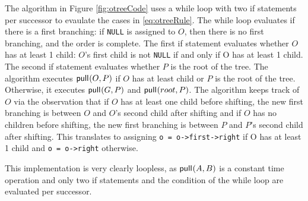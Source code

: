     The algorithm in Figure \ref{fig:otreeCode} uses a while loop with two if statements per successor to evaulate the cases in \eqref{eq:otreeRule}.  The while loop evaluates if there is a first branching: if \verb+NULL+ is assigned to $O$, then there is no first branching, and the order is complete.  The first if statement evaluates whether $O$ has at least 1 child: $O$'s first child is not \verb+NULL+ if and only if O has at least 1 child. The second if statement evaluates whether $P$ is the root of the tree.  The algorithm executes $\mathsf{pull}_{}(O,P)$ if $O$ has at least child or $P$ is the root of the tree.  Otherwise, it executes $\mathsf{pull}_{}(G,P)$ and $\mathsf{pull}_{}(root,P)$.  The algorithm keeps track of $O$ via the observation that if $O$ has at least one child before shifting, the new first branching is between $O$ and $O$'s second child after shifting and if $O$ has no children before shifting, the new first branching is between $P$ and $P$'s second child after shifting. This translates to assigning \verb+o = o->first->right+ if O has at least 1 child and \verb+o = o->right+ otherwise.

    This implementation is very clearly loopless, as $\mathsf{pull}_{}(A,B)$ is a constant time operation and only two if statements and the condition of the while loop are evaluated per successor.


